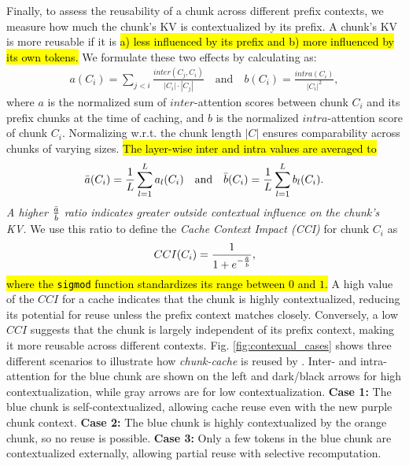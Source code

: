 Finally, to assess the reusability of a chunk across different prefix contexts, we measure how much the chunk's KV is contextualized by its prefix. A chunk’s KV is more reusable if it is \hl{a) less influenced by its prefix and b) more influenced by its own tokens.} 
We formulate these two effects by calculating as:
\begin{align}
    a(C_i) = \sum_{j < i} \frac{{inter}(C_j,C_i)}{|C_i| \cdot |C_j|} \quad \text{and} \quad b(C_i) = \frac{{intra}(C_i)}{|C_i|^2},
\end{align}
where $a$ is the normalized sum of $inter$-attention scores between chunk $C_i$ and its prefix chunks at the time of caching,
and $b$ is the normalized $intra$-attention score of chunk $C_i$. 
Normalizing w.r.t. the chunk length $|C|$ ensures comparability across chunks of varying sizes.
\hl{The layer-wise inter and intra values
are averaged to 
\begin{align}
    \Bar{a}(C_i) = \frac{1}{L}\sum_{l=1}^L a_l(C_i) \quad \text{and} \quad \Bar{b}(C_i) = \frac{1}{L}\sum_{l=1}^L b_l(C_i).
\end{align}}
\textit{A higher $\frac{\Bar{a}}{\Bar{b}}$ ratio indicates greater outside contextual influence on the chunk's KV.} 
We use this ratio to define the \textit{Cache Context Impact (CCI)} for chunk $C_i$ as
\begin{align}
    CCI(C_i) = \frac{1}{1 + e^{-\frac{\Bar{a}}{\Bar{b}}}},
\end{align}
\hl{where the \texttt{sigmod} function standardizes its range between $0$ and $1$.}
A high value of the $CCI$ for a cache indicates that the chunk is highly contextualized, reducing its potential for reuse unless the prefix context matches closely. Conversely, a low $CCI$ suggests that the chunk is largely independent of its prefix context, making it more reusable across different contexts. 
%
Fig. \ref{fig:contexual_cases} shows three different scenarios to illustrate how \textit{chunk-cache} is reused by \sys.
%
Inter- and intra-attention for the blue chunk are shown on the left and dark/black arrows for high contextualization, while gray arrows are for low contextualization. \textbf{Case 1:} The blue chunk is self-contextualized, allowing cache reuse even with the new purple chunk context. \textbf{Case 2:} The blue chunk is highly contextualized by the orange chunk, so no reuse is possible. \textbf{Case 3:} Only a few tokens in the blue chunk are contextualized externally, allowing partial reuse with selective recomputation.


